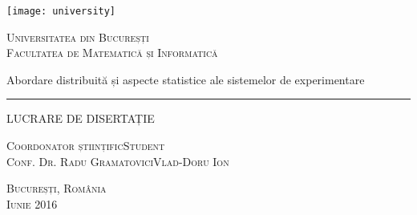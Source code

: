 \begin{titlepage}
	\begin{center}

		\texttt{[image: university]}

		\vspace{0.5cm}
		\LARGE \textsc{Universitatea din Bucureșți}
		\\
		\vspace{0.5cm}
		\Large \textsc{Facultatea de Matematică și Informatică}

		\vfill

		\Huge Abordare distribuită și aspecte statistice ale sistemelor de experimentare
		\rule{\textwidth}{1pt}
		\Large LUCRARE DE DISERTAȚIE

		\vfill

		\Large
		\textsc{Coordonator științific}\hfill \textsc{Student}
		\\
		\large
		\textsc{Conf. Dr. Radu Gramatovici}\hfill \textsc{Vlad-Doru Ion}
	
		\vspace{1.5cm}
		\textsc{Bucureșți, România}\\
		\textsc{Iunie 2016}

	\end{center}
\end{titlepage}
 
